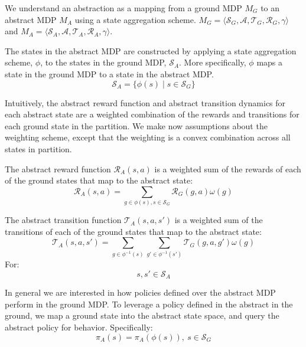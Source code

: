 \documentclass{article}
\begin{document}
We understand an abstraction as a mapping from a ground MDP $M_G$ to an abstract MDP $M_A$ using a state aggregation scheme. $M_G = \langle \mathcal{S}_G, \mathcal{A}, \mathcal{T}_G, \mathcal{R}_G, \gamma \rangle$ and $M_A = \langle \mathcal{S}_A, \mathcal{A}, \mathcal{T}_A, \mathcal{R}_A, \gamma \rangle$.

The states in the abstract MDP are constructed by applying a state aggregation scheme, $\phi$, to the states in the ground MDP, $\mathcal{S}_A$. More specifically, $\phi$ maps a state in the ground MDP to a state in the abstract MDP.
\begin{equation}
\mathcal{S}_A = \{ \phi(s) \mid s \in \mathcal{S}_G\}
\end{equation}

Intuitively, the abstract reward function and abstract transition dynamics for each abstract state are a weighted combination of the rewards and transitions for each ground state in the partition. We make now assumptions about the weighting scheme, except that the weighting is a convex combination across all states in partition.

The abstract reward function $\mathcal{R}_A(s,a)$ is a weighted sum of the rewards of each of the ground states that map to the abstract state:
\begin{equation}
\mathcal{R}_A(s,a) = \sum_{g \in \phi(s), s \in \mathcal{S}_G} \mathcal{R}_G(g,a) \omega(g) 
\end{equation}


The abstract transition function $\mathcal{T}_A(s,a,s')$ is a weighted sum of the transitions of each of the ground states that map to the abstract state:
\begin{equation}
\mathcal{T}_A(s,a,s') = \sum_{g \in \phi^{-1}(s)} \sum_{g' \in \phi^{-1}(s')} \mathcal{T}_G(g,a,g') \omega(g) 
\end{equation}
For:
\begin{equation}
s, s' \in \mathcal{S}_A
\end{equation}

In general we are interested in how policies defined over the abstract MDP perform in the ground MDP. To leverage a policy defined in the abstract in the ground, we map a ground state into the abstract state space, and query the abstract policy for behavior. Specifically:
\begin{equation}
\pi_A(s) = \pi_A(\phi(s)),\ s \in \mathcal{S}_G
\end{equation}
\end{document}
